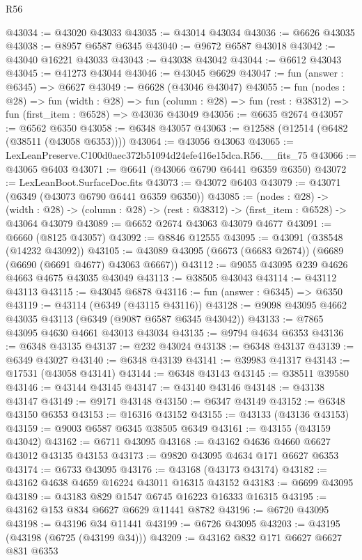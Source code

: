 \begin{lexlean}{R56}
\begin{coremodule}
@43034 := @43020 @43033
@43035 := @43014 @43034
@43036 := @6626 @43035
@43038 := @8957 @6587 @6345
@43040 := @9672 @6587 @43018
@43042 := @43040 @16221 @43033
@43043 := @43038 @43042
@43044 := @6612 @43043
@43045 := @41273 @43044
@43046 := @43045 @6629
@43047 := fun (answer : @6345) => @6627
@43049 := @6628 (@43046 @43047)
@43055 := fun (nodes : @28) =>
  fun (width : @28) =>
  fun (column : @28) => fun (rest : @38312) => fun (first_item : @6528) => @43036 @43049
@43056 := @6635 @2674
@43057 := @6562 @6350
@43058 := @6348 @43057
@43063 := @12588 (@12514 (@6482 (@38511 (@43058 @6353))))
@43064 := @43056 @43063
@43065 := LexLeanPreserve.C100d0aec372b51094d24efe416e15dca.R56.__fits_75
@43066 := @43065 @6403
@43071 := @6641 (@43066 @6790 @6441 @6359 @6350)
@43072 := LexLeanBoot.SurfaceDoc.fits
@43073 := @43072 @6403
@43079 := @43071 (@6349 (@43073 @6790 @6441 @6359 @6350))
@43085 := (nodes : @28) ->
  (width : @28) -> (column : @28) -> (rest : @38312) -> (first_item : @6528) -> @43064 @43079
@43089 := @6652 @2674 @43063 @43079 @4677
@43091 := @6660 (@8125 @43057)
@43092 := @8846 @12555
@43095 := @43091 (@38548 (@14232 @43092))
@43105 := @43089 @43095 (@6673 (@6683 @2674)) (@6689 (@6690 (@6691 @4677) @43063 @6667))
@43112 := @9055 @43095 @239 @4626 @4663 @4675 @43035 @43049
@43113 := @38505 @43043
@43114 := @43112 @43113
@43115 := @43045 @6878
@43116 := fun (answer : @6345) => @6350
@43119 := @43114 (@6349 (@43115 @43116))
@43128 := @9098 @43095 @4662 @43035 @43113 (@6349 (@9087 @6587 @6345 @43042))
@43133 := @7865 @43095 @4630 @4661 @43013 @43034
@43135 := @9794 @4634 @6353
@43136 := @6348 @43135
@43137 := @232 @43024
@43138 := @6348 @43137
@43139 := @6349 @43027
@43140 := @6348 @43139
@43141 := @39983 @41317
@43143 := @17531 (@43058 @43141)
@43144 := @6348 @43143
@43145 := @38511 @39580
@43146 := @43144 @43145
@43147 := @43140 @43146
@43148 := @43138 @43147
@43149 := @9171 @43148
@43150 := @6347 @43149
@43152 := @6348 @43150 @6353
@43153 := @16316 @43152
@43155 := @43133 (@43136 @43153)
@43159 := @9003 @6587 @6345 @38505 @6349
@43161 := @43155 (@43159 @43042)
@43162 := @6711 @43095
@43168 := @43162 @4636 @4660 @6627 @43012 @43135 @43153
@43173 := @9820 @43095 @4634 @171 @6627 @6353
@43174 := @6733 @43095
@43176 := @43168 (@43173 @43174)
@43182 := @43162 @4638 @4659 @16224 @43011 @16315 @43152
@43183 := @6699 @43095
@43189 := @43183 @829 @1547 @6745 @16223 @16333 @16315
@43195 := @43162 @153 @834 @6627 @6629 @11441 @8782
@43196 := @6720 @43095
@43198 := @43196 @34 @11441
@43199 := @6726 @43095
@43203 := @43195 (@43198 (@6725 (@43199 @34)))
@43209 := @43162 @832 @171 @6627 @6627 @831 @6353

\end{coremodule}
\end{lexlean}

